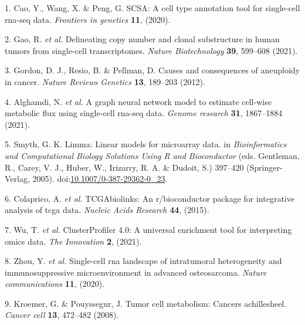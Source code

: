 \documentclass[
]{article}
\newenvironment{cslreferences}%
  {}%
  {\par}
\begin{document}
\begin{cslreferences}
\leavevmode\hypertarget{ref-ScsaACellTyCaoY2020}{}%
1. Cao, Y., Wang, X. \& Peng, G. SCSA: A cell type annotation tool for single-cell rna-seq data. \emph{Frontiers in genetics} \textbf{11}, (2020).

\leavevmode\hypertarget{ref-DelineatingCopGaoR2021}{}%
2. Gao, R. \emph{et al.} Delineating copy number and clonal substructure in human tumors from single-cell transcriptomes. \emph{Nature Biotechnology} \textbf{39}, 599--608 (2021).

\leavevmode\hypertarget{ref-CausesAndConsGordon2012}{}%
3. Gordon, D. J., Resio, B. \& Pellman, D. Causes and consequences of aneuploidy in cancer. \emph{Nature Reviews Genetics} \textbf{13}, 189--203 (2012).

\leavevmode\hypertarget{ref-AGraphNeuralAlgham2021}{}%
4. Alghamdi, N. \emph{et al.} A graph neural network model to estimate cell-wise metabolic flux using single-cell rna-seq data. \emph{Genome research} \textbf{31}, 1867--1884 (2021).

\leavevmode\hypertarget{ref-LimmaLinearMSmyth2005}{}%
5. Smyth, G. K. Limma: Linear models for microarray data. in \emph{Bioinformatics and Computational Biology Solutions Using R and Bioconductor} (eds. Gentleman, R., Carey, V. J., Huber, W., Irizarry, R. A. \& Dudoit, S.) 397--420 (Springer-Verlag, 2005). doi:\href{https://doi.org/10.1007/0-387-29362-0_23}{10.1007/0-387-29362-0\_23}.

\leavevmode\hypertarget{ref-TcgabiolinksAColapr2015}{}%
6. Colaprico, A. \emph{et al.} TCGAbiolinks: An r/bioconductor package for integrative analysis of tcga data. \emph{Nucleic Acids Research} \textbf{44}, (2015).

\leavevmode\hypertarget{ref-ClusterprofilerWuTi2021}{}%
7. Wu, T. \emph{et al.} ClusterProfiler 4.0: A universal enrichment tool for interpreting omics data. \emph{The Innovation} \textbf{2}, (2021).

\leavevmode\hypertarget{ref-Single_cell_RNA_Zhou_2020}{}%
8. Zhou, Y. \emph{et al.} Single-cell rna landscape of intratumoral heterogeneity and immunosuppressive microenvironment in advanced osteosarcoma. \emph{Nature communications} \textbf{11}, (2020).

\leavevmode\hypertarget{ref-Tumor_cell_meta_Kroeme_2008}{}%
9. Kroemer, G. \& Pouyssegur, J. Tumor cell metabolism: Cancers achillesheel. \emph{Cancer cell} \textbf{13}, 472--482 (2008).
\end{cslreferences}
\end{document}

